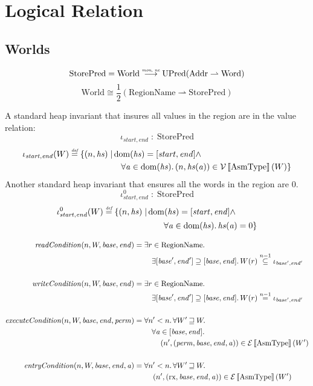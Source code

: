 \documentclass{article}
\newcommand{\sem}[1]{\left\llbracket #1 \right\rrbracket}
\newcommand{\parfun}{\rightharpoonup}
\newcommand{\monnefun}{\stackrel{\textit{\tiny{mon, ne}}}{\longrightarrow}}
\newcommand{\defeq}{\stackrel{\textit{\tiny{def}}}{=}}
\newcommand{\nequal}[1][n]{\stackrel{\tiny{#1}}{=}}
\newcommand{\nsubeq}[1][n]{\stackrel{\tiny{#1}}{\subseteq}}
\DeclareMathOperator{\dom}{dom}
\newcommand{\var}[1]{\mathit{#1}}
\newcommand{\addr}{\var{a}}
\newcommand{\start}{\var{base}}
\newcommand{\addrend}{\var{end}}
\newcommand{\heapseg}{\var{hs}}
\newcommand{\perm}{\var{perm}}
\newcommand{\plainfun}[1]{\mathit{#1}}
\newcommand{\readCond}[1]{\plainfun{readCondition}(#1)}
\newcommand{\writeCond}[1]{\plainfun{writeCondition}(#1)}
\newcommand{\execCond}[1]{\plainfun{executeCondition}(#1)}
\newcommand{\entryCond}[1]{\plainfun{entryCondition}(#1)}
\newcommand{\future}{\mathbin{\sqsupseteq}}
\newcommand{\asmType}{\plaindom{AsmType}}
\newcommand{\plaindom}[1]{\mathrm{#1}}
\newcommand{\Words}{\plaindom{Word}}
\newcommand{\Addrs}{\plaindom{Addr}}
\newcommand{\RegionName}{\plaindom{RegionName}}
\newcommand{\Worlds}{\plaindom{World}}
\newcommand{\StorePred}{\plaindom{StorePred}}
\newcommand{\UPred}[1]{\plaindom{UPred}(#1)}
\newcommand{\intr}[2]{\mathcal{#1}\sem{#2}}
\newcommand{\valueintr}[1]{\intr{V}{#1}}
\newcommand{\exprintr}[1]{\intr{E}{#1}}
\newcommand{\stdvr}{\valueintr{\asmType}}
\newcommand{\stder}{\exprintr{\asmType}}
\newcommand{\npair}[2][n]{\left(#1,#2 \right)}
\newcommand{\plainperm}[1]{\mathrm{#1}}
\newcommand{\exec}{\plainperm{rx}}
\begin{document}
\section{Logical Relation}
\label{sec:logical-relation}
\subsection{Worlds}
\[
  \StorePred = \Worlds \monnefun \UPred{\Addrs \parfun \Words}
\]
\[
\Worlds \cong \frac{1}{2} (\RegionName \parfun \StorePred)
\]

A standard heap invariant that insures all values in the region are in the value  relation:
\[
  \iota_{\var{start},\var{end}} \; : \; \StorePred
\]
\begin{align*}
  \iota_{\var{start},\var{end}}(W) \defeq  \{ \npair{\heapseg} \mid & \dom(\heapseg) = [\var{start},\var{end}] \land \\
                                                               & \quad \forall \addr \in \dom(\heapseg) \ldotp \npair{\heapseg(\addr)} \in \stdvr(W) \}
\end{align*}
Another standard heap invariant that ensures all the words in the region are 0.
\[
  \iota_{\var{start},\var{end}}^0 \; : \; \StorePred
\]
\begin{align*}
  \iota_{\var{start},\var{end}}^0(W) \defeq \{ \npair{\heapseg} \mid & \dom(\heapseg) = [\var{start},\var{end}] \land \\
                                                                & \qquad \forall \addr \in \dom(\heapseg) \ldotp \heapseg(\addr) = 0  \}
\end{align*}


\begin{align*}
  \readCond{n,W,\start,\addrend} =        & \;\exists r \in \RegionName \ldotp \\
                                          & \;\quad \exists [\start',\addrend'] \supseteq [\start,\addrend] \ldotp W(r) \nsubeq[n-1] \iota_{\start',\addrend'} \\ & \\
  \writeCond{n,W,\start,\addrend} =       & \; \exists r \in \RegionName \ldotp \\
                                          & \;\quad \exists [\start',\addrend'] \supseteq [\start,\addrend] \ldotp W(r) \nequal[n-1] \iota_{\start',\addrend'} \\ & \\
  \execCond{n,W,\start,\addrend,\perm} =  & \; \forall n' < n \ldotp \forall W' \future W \ldotp \\
                                          & \; \quad \forall \addr \in [\start,\addrend] \ldotp \\
                                          & \; \qquad \npair[n']{(\perm,\start,\addrend,\addr)} \in \stder(W') \\ & \\
  \entryCond{n,W,\start,\addrend,\addr} = & \; \forall n' < n \ldotp \forall W' \future W \ldotp \\
                                          & \; \quad \npair[n']{(\exec,\start,\addrend,\addr)} \in \stder(W') \\
\end{align*}
\end{document}
